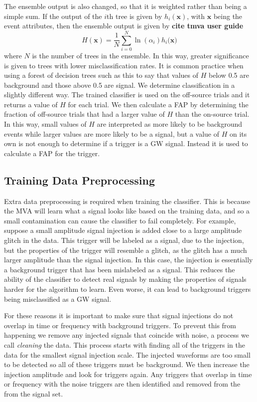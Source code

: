 \documentclass[11pt]{cuthesis}
\begin{document}
The ensemble output is also changed, so that it is weighted rather than being a simple sum. If the output of the $i$th tree is given by $h_i(\textbf{x})$, with $\textbf{x}$ being the event attributes, then the ensemble output is given by \textbf{cite tmva user guide}
\begin{equation}
H(\textbf{x}) = \frac{1}{N}\sum_{i=0}^N \ln(\alpha_i)h_i(\textbf{x)}
\end{equation}  
where $N$ is the number of trees in the ensemble. In this way, greater significance is given to trees with lower misclassification rates. It is common practice when using a forest of decision trees such as this to say that values of $H$ below 0.5 are background and those above 0.5 are signal. We determine classification in a slightly different way. The trained classifier is used on the off-source trials and it returns a value of $H$ for each trial. We then calculate a FAP by determining the fraction of off-source trials that had a larger value of $H$ than the on-source trial. In this way, small values of $H$ are interpreted as more likely to be background events while larger values are more likely to be a signal, but a value of $H$ on its own is not enough to determine if a trigger is a GW signal. Instead it is used to calculate a FAP for the trigger.

\subsection{Training Data Preprocessing}\label{sec:data-preprocessing}
Extra data preprocessing is required when training the classifier. This is because the MVA will learn what a signal looks like based on the training data, and so a small contamination can cause the classifier to fail completely. For example, suppose a small amplitude signal injection is added close to a large amplitude glitch in the data. This trigger will be labeled as a signal, due to the injection, but the properties of the trigger will resemble a glitch, as the glitch has a much larger amplitude than the signal injection. In this case, the injection is essentially a background trigger that has been mislabeled as a signal. This reduces the ability of the classifier to detect real signals by making the properties of signals harder for the algorithm to learn. Even worse, it can lead to background triggers being misclassified as a GW signal.  

For these reasons it is important to make sure that signal injections do not overlap in time or frequency with background triggers. To prevent this from happening we remove any injected signals that coincide with noise, a process we call \textit{cleaning} the data. This process starts with finding all of the triggers in the data for the smallest signal injection scale. The injected waveforms are too small to be detected so all of these triggers must be background. We then increase the injection amplitude and look for triggers again. Any triggers that overlap in time or frequency with the noise triggers are then identified and removed from the from the signal set. 
\end{document}
